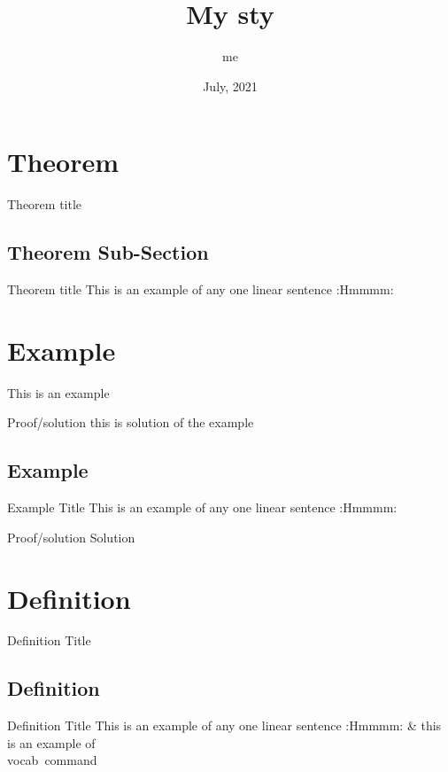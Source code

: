 \documentclass[11pt]{scrartcl} %
\title{My sty}
\author{me}
\date{July, 2021}
\begin{document}
\maketitle
\par
\vspace{2cm}
\tableofcontents

\newpage



\section{Theorem}
\begin{theorem}{Theorem title} 
\lipsum[1]
\end{theorem}
\lipsum[1]

\subsection{Theorem Sub-Section}
\begin{theorem}{Theorem title}
This is an example of any one linear sentence :Hmmmm:
\end{theorem}
\newpage
\section{Example}
\begin{example}{}
This is an example
\end{example}
\begin{examplesolution}{Proof/solution}
this is solution of the example
\end{examplesolution}
\subsection{Example}
\begin{example}{Example Title}
This is an example of any one linear sentence :Hmmmm:
\end{example}
\begin{examplesolution}{Proof/solution}
Solution
\end{examplesolution}
\newpage

\section{Definition}
\begin{definition}{Definition Title}
\lipsum[5]
\end{definition}

\subsection{Definition}
\begin{definition}{Definition Title}
This is an example of any one linear sentence :Hmmmm: \& this is an example of \\vocab\ command  
\end{definition}
\newpage
\end{document}
